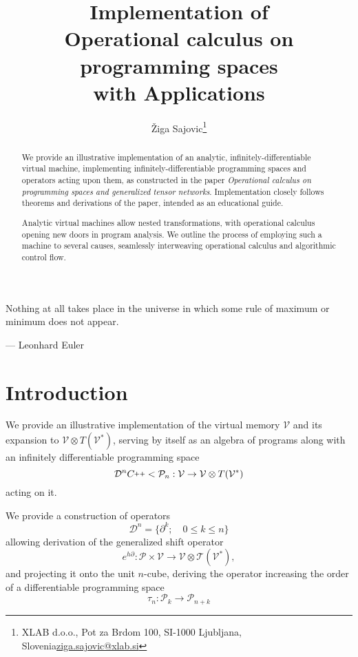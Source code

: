 \documentclass{article}
\title{Implementation of \\ Operational calculus on programming spaces \\ with Applications}
\author{Žiga Sajovic\footnote{XLAB d.o.o., Pot za Brdom 100, SI-1000 Ljubljana, Slovenia\newline \href{mail.to:ziga.sajovic@xlab.si}{ziga.sajovic@xlab.si}}}
\newcommand{\T}{\mathcal{T}}
\newcommand{\VV}{\mathcal{V}}
\newcommand{\CC}{C\nolinebreak\hspace{-.05em}\raisebox{.4ex}{\tiny\bf +}\nolinebreak\hspace{-.10em}\raisebox{.4ex}{\tiny\bf +}}
\def\CC{{C\nolinebreak[4]\hspace{-.05em}\raisebox{.4ex}{\tiny\bf ++}}}
\newcommand{\dP}{\mathcal{P}}
\newcommand{\D}{\partial}
\newcommand{\DD}{\mathcal{D}}
\newcommand{\sumd}{\tau}
\begin{document}
\maketitle

\begin{abstract}
We provide an illustrative implementation of an analytic, infinitely-differentiable virtual machine, implementing infinitely-differentiable programming spaces and operators acting upon them, as constructed in the paper \emph{Operational calculus on programming spaces and generalized tensor networks}\cite{OperationalCalculus}. Implementation closely follows theorems and derivations of the paper, intended as an educational guide.

Analytic virtual machines allow nested transformations, with operational calculus opening new doors in program analysis. We outline the process of employing such a machine to several causes, seamlessly interweaving operational calculus and algorithmic control flow. 
\end{abstract}

\epigraph{Nothing at all takes place in the universe in which some rule of maximum or minimum does not appear.}{--- \textup{Leonhard Euler}}
\clearpage
\tableofcontents
\clearpage
\section{Introduction}\label{sec:introduction}
We provide an illustrative implementation of the virtual memory $\VV$ and its expansion to $\VV\otimes T(\VV^*)$, serving by itself as an algebra of programs along with an infinitely differentiable programming space \cite[Theorem~5.1]{OperationalCalculus}
\begin{equation}
\DD^n\CC<\dP_n:\VV\to\VV\otimes T(\VV^*)
\end{equation}
acting on it.

We provide a construction of operators
\begin{equation}
\DD^n=\{\D^k;\quad 0\le k\le n\}
\end{equation}
allowing derivation of the generalized shift operator \cite[Theorem~5.4]{OperationalCalculus}
 \begin{equation}
                  	e^{h\D}:\dP\times \VV\to \VV\otimes \T(\VV^*),
         \end{equation}
and projecting it onto the unit $n$-cube, deriving the operator increasing the order of a differentiable programming space \cite[Corollary~5.2]{OperationalCalculus}
\begin{equation}\label{eq:sumd}
\sumd_n:\dP_k\to\dP_{n+k}
\end{equation} 
\end{document}
